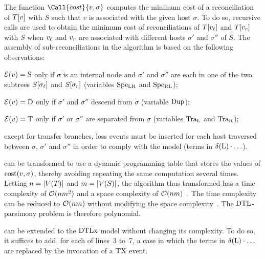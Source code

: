 The function \(\Call{cost}{v, \sigma}\) computes the minimum cost of a reconciliation of \(T[v]\) with \(S\) such that \(v\) is associated with the given host \(\sigma\).
To do so, recursive calls are used to obtain the minimum cost of reconciliations of \(T[v_\mathit{\ell}]\) and \(T[v_r]\) with \(S\) when \(v_\mathit{\ell}\) and \(v_r\) are associated with different hosts \(\sigma'\) and \(\sigma''\) of \(S\).
The assembly of sub-reconciliations in the algorithm is based on the following observations:
\begin{compactitemize}
    \item \(\mathcal{E}(v) = \mathrm{S}\) only if \(\sigma\) is an internal node and \(\sigma'\) and \(\sigma''\) are each in one of the two subtrees \(S[\sigma_\mathit{\ell}]\) and \(S[\sigma_r]\) (variables \(\mathrm{Spe_{LR}}\) and \(\mathrm{Spe_{RL}}\));
    \item \(\mathcal{E}(v) = \mathrm{D}\) only if \(\sigma'\) and \(\sigma''\) descend from \(\sigma\) (variable \(\mathrm{Dup}\));
    \item \(\mathcal{E}(v) = \mathrm{T}\) only if \(\sigma'\) or \(\sigma''\) are separated from \(\sigma\) (variables \(\mathrm{Tra_L}\) and \(\mathrm{Tra_R}\));
    \item except for transfer branches, loss events must be inserted for each host traversed between \(\sigma\), \(\sigma'\) and \(\sigma''\) in order to comply with the model (terms in \(\delta\kern.1pt(\mathrm{L}) \cdot \hdots\)).
\end{compactitemize}

 can be transformed to use a dynamic programming table that stores the values of \(\mathrm{cost}(v, \sigma)\), thereby avoiding repeating the same computation several times.
Letting \(n = \lvert V(T)\rvert\) and \(m = \lvert V(S)\rvert\), the algorithm thus transformed has a time complexity of \(\operatorname{\mathcal{O}}(nm^2)\) and a space complexity of \(\operatorname{\mathcal{O}}(nm)\)~\parencite{Tofigh2011SimultaneousIdentificationDuplications}.
The time complexity can be reduced to \(\operatorname{\mathcal{O}}(nm)\) without modifying the space complexity~\parencite{Bansal2012EfficientAlgorithmsReconciliation}.
The \(\mathrm{D}\mathrm{T}\mathrm{L}\)-parsimony problem is therefore polynomial.

 can be extended to the \(\mathrm{D}\mathrm{T}\mathrm{L}\mathrm{x}\) model without changing its complexity.
To do so, it suffices to add, for each of lines~3 to~7, a case in which the terms in \(\delta\kern.1pt(\mathrm{L}) \cdot \hdots\) are replaced by the invocation of a \(\mathrm{TX}\) event.

